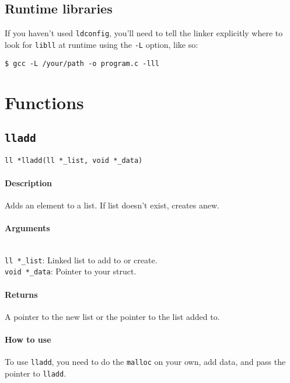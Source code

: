 \documentclass{article}
\begin{document}
\subsection{Runtime libraries}
If you haven't used \texttt{ldconfig}, you'll need to tell the linker explicitly where to look for \texttt{libll} at runtime using the \texttt{-L} option, like so:
\begin{verbatim}
$ gcc -L /your/path -o program.c -lll
\end{verbatim}


\section{Functions}

\subsection{\texttt{lladd}}

\begin{verbatim}
ll *lladd(ll *_list, void *_data) 
\end{verbatim}

\paragraph{Description}
Adds an element to a list. If list doesn't exist, creates anew.

\paragraph{Arguments}
\verb| |\\
\verb|ll *_list|: Linked list to add to or create.\\
\verb|void *_data|: Pointer to your struct. 

\paragraph{Returns}

A pointer to the new list or the pointer to the list added to.

\paragraph{How to use}

To use \verb|lladd|, you need to do the \verb|malloc| on your own, add data, and pass the pointer to \verb|lladd|.
\end{document}
